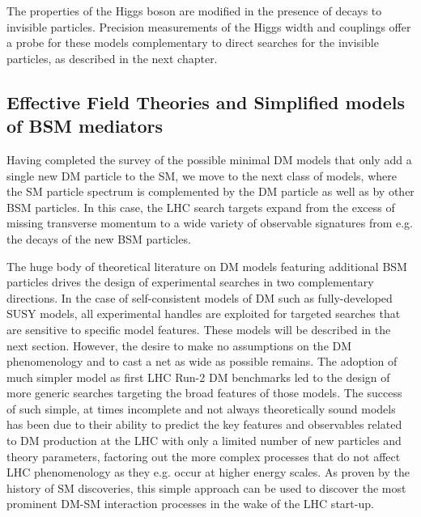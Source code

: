 
The properties of the Higgs boson are modified in the presence of decays to invisible particles. Precision measurements of the Higgs width and couplings offer a probe for these models complementary to direct searches for the invisible particles, as described in the next chapter. 



\subsection{Effective Field Theories and Simplified models of BSM mediators}
\label{sec:BSMMediatorModels}

Having completed the survey of the possible minimal DM models that only add a single new DM particle to the SM, we move to the next class of models, where the SM particle spectrum is complemented by the DM particle as well as by other BSM particles. In this case, the LHC search targets expand from the excess of missing transverse momentum to a wide variety of observable signatures from e.g. the decays of the new BSM particles. 

The huge body of theoretical literature on DM models featuring additional BSM particles drives the design of experimental searches in two complementary directions. In the case of self-consistent models of DM such as fully-developed SUSY models, all experimental handles are exploited for targeted searches that are sensitive to specific model features. These models will be described in the next section. However, the desire to make no assumptions on the DM phenomenology and to cast a net as wide as possible remains. The adoption of much simpler model as first LHC Run-2 DM benchmarks led to the design of more generic searches targeting the broad features of those models. The success of such simple, at times incomplete and not always theoretically sound models has been due to their ability to predict the key features and observables related to DM production at the LHC with only a limited number of new particles and theory parameters, factoring out the more complex processes that do not affect LHC phenomenology as they e.g. occur at higher energy scales. As proven by the history of SM discoveries, this simple approach can be used to discover the most prominent DM-SM interaction processes in the wake of the LHC start-up. 

